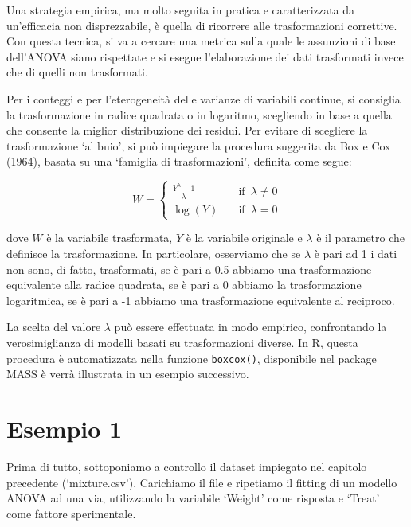 \documentclass[a4paper,12pt,oneside]{book}
\begin{document}
Una strategia empirica, ma molto seguita in pratica e caratterizzata da un'efficacia non disprezzabile, è quella di ricorrere alle trasformazioni correttive. Con questa tecnica, si va a cercare una metrica sulla quale le assunzioni di base dell'ANOVA siano rispettate e si esegue l'elaborazione dei dati trasformati invece che di quelli non trasformati.

Per i conteggi e per l'eterogeneità delle varianze di variabili continue, si consiglia la trasformazione in radice quadrata o in logaritmo, scegliendo in base a quella che consente la miglior distribuzione dei residui. Per evitare di scegliere la trasformazione `al buio', si può impiegare la procedura suggerita da Box e Cox (1964), basata su una `famiglia di trasformazioni', definita come segue:

\[ W = \left\{ \begin{array}{ll}
\frac{Y^\lambda - 1}{\lambda} & \quad \textrm{if} \,\,\, \lambda \neq 0 \\
\log(Y) & \quad \textrm{if} \,\,\, \lambda = 0
\end{array} \right.\]

dove \(W\) è la variabile trasformata, \(Y\) è la variabile originale e \(\lambda\) è il parametro che definisce la trasformazione. In particolare, osserviamo che se \(\lambda\) è pari ad 1 i dati non sono, di fatto, trasformati, se è pari a 0.5 abbiamo una trasformazione equivalente alla radice quadrata, se è pari a 0 abbiamo la trasformazione logaritmica, se è pari a -1 abbiamo una trasformazione equivalente al reciproco.

La scelta del valore \(\lambda\) può essere effettuata in modo empirico, confrontando la verosimiglianza di modelli basati su trasformazioni diverse. In R, questa procedura è automatizzata nella funzione \texttt{boxcox()}, disponibile nel package MASS è verrà illustrata in un esempio successivo.

\hypertarget{esempio-1}{%
\section{Esempio 1}\label{esempio-1}}

Prima di tutto, sottoponiamo a controllo il dataset impiegato nel capitolo precedente (`mixture.csv'). Carichiamo il file e ripetiamo il fitting di un modello ANOVA ad una via, utilizzando la variabile `Weight' come risposta e `Treat' come fattore sperimentale.
\end{document}
